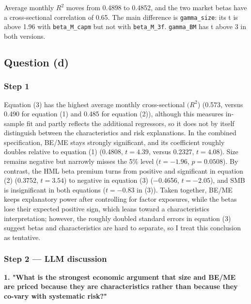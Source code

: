 \documentclass[11pt,letterpaper]{article}
\begin{document}
Average monthly \(R^2\) moves from 0.4898 to 0.4852, and the two market betas have a cross-sectional correlation of 0.65. The main difference is \texttt{gamma\_size}: its \textbar t\textbar{} is above 1.96 with \texttt{beta\_M\_capm} but not with \texttt{beta\_M\_3f}. \texttt{gamma\_BM} has t above 3 in both versions.

\hypertarget{question-d}{%
\subsection{Question (d)}\label{question-d}}

\hypertarget{step-1}{%
\subsubsection{Step 1}\label{step-1}}

Equation (3) has the highest average monthly cross-sectional \((R^2\)) (0.573, versus 0.490 for equation (1) and 0.485 for equation (2)), although this measures in-sample fit and partly reflects the additional regressors, so it does not by itself distinguish between the characteristics and risk explanations. In the combined specification, BE/ME stays strongly significant, and its coefficient roughly doubles relative to equation (1) (0.4808, \(t = 4.39\), versus 0.2327, \(t = 4.08\)). Size remains negative but narrowly misses the 5\% level (\(t = -1.96\), \(p = 0.0508\)). By contrast, the HML beta premium turns from positive and significant in equation (2) (0.3752, \(t = 3.54\)) to negative in equation (3) (−0.4656, \(t = -2.05\)), and SMB is insignificant in both equations (\(t = -0.83\) in (3)). Taken together, BE/ME keeps explanatory power after controlling for factor exposures, while the betas lose their expected positive sign, which leans toward a characteristics interpretation; however, the roughly doubled standard errors in equation (3) suggest betas and characteristics are hard to separate, so I treat this conclusion as tentative.

\hypertarget{step-2-llm-discussion}{%
\subsubsection{Step 2 --- LLM discussion}\label{step-2-llm-discussion}}

\textbf{1. "What is the strongest economic argument that size and BE/ME are priced because they are characteristics rather than because they co-vary with systematic risk?"}
\end{document}
